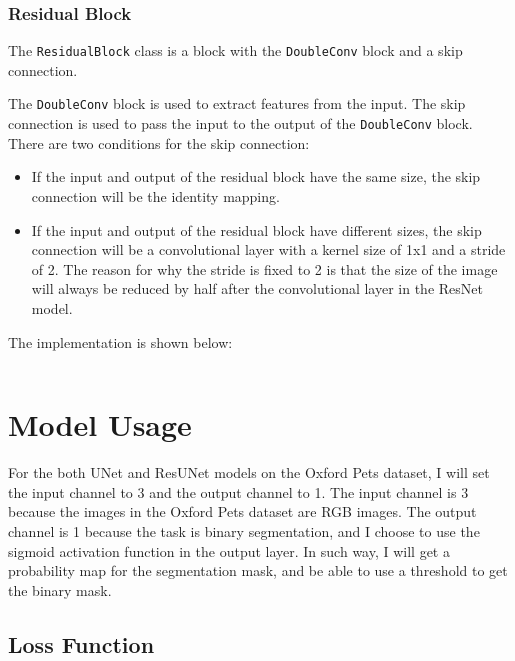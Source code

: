 \inputminted[firstline=4, highlightlines={16,21}]{python}{../src/models/common.py}

\subsubsection{Residual Block}
\label{sec:residual_block}

The \texttt{ResidualBlock} class is a block with the \texttt{DoubleConv} block and a skip connection.

The \texttt{DoubleConv} block is used to extract features from the input.
The skip connection is used to pass the input to the output of the \texttt{DoubleConv} block.
There are two conditions for the skip connection:
\begin{itemize}
    \item If the input and output of the residual block have the same size, the skip connection will be the identity mapping.
    \item If the input and output of the residual block have different sizes, the skip connection will be a convolutional layer with a kernel size of 1x1 and a stride of 2.
          The reason for why the stride is fixed to 2 is that the size of the image will always be reduced by half after the convolutional layer in the ResNet model.
\end{itemize}

The implementation is shown below:

\inputminted[firstline=7, lastline=20]{python}{../src/models/resnet34_unet.py}

\section{Model Usage}

For the both UNet and ResUNet models on the Oxford Pets dataset, I will set the input channel to 3 and the output channel to 1.
The input channel is 3 because the images in the Oxford Pets dataset are RGB images.
The output channel is 1 because the task is binary segmentation, and I choose to use the sigmoid activation function in the output layer.
In such way, I will get a probability map for the segmentation mask, and be able to use a threshold to get the binary mask.

\subsection{Loss Function}
\label{sec:loss_function}

